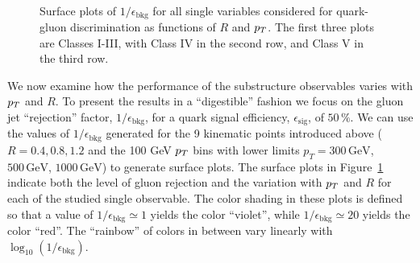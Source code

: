 \begin{figure}
\\
\caption{Surface plots of $1/\epsilon_\text{bkg}$ for all single variables considered for
  quark-gluon discrimination as functions of $R$ and $p_T$. The first three plots are Classes I-III, with Class IV in the second row, and Class V in the third row. }
\label{fig:qg_surface_single}
\end{figure}
%

We now examine how the performance of the substructure observables varies with $p_T$ and $R$.  To present the results in a ``digestible'' fashion
we  focus on the gluon jet ``rejection'' factor, $1/\epsilon_\text{bkg}$, for a quark signal efficiency, $\epsilon_\text{sig}$, of $50\,\%$.
We can use the values of $1/\epsilon_\text{bkg}$ generated for the 9 kinematic points introduced above ($R = 0.4, 0.8, 1.2$ and 
the 100 GeV $p_T$ bins with lower limits
$p_T = 300\, \text{GeV}$, $500\, \text{GeV}$, $1000\,\text{GeV}$) to generate surface plots.  The surface plots in Figure~\ref{fig:qg_surface_single}
indicate both the level of gluon rejection
and the variation with $p_T$ and $R$ for each of the studied single observable. 
The color shading in these plots is defined so that a value of $1/\epsilon_\text{bkg}\simeq 1$ yields the color ``violet'', while 
$1/\epsilon_\text{bkg}\simeq 20 $ yields the color ``red''.   The ``rainbow'' of colors in between vary linearly with $\log_{10} (1/\epsilon_\text{bkg})$. 


